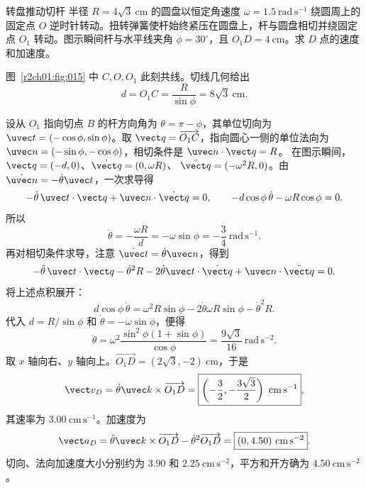 \begin{practicebox}{转盘推动切杆}
半径 $R=4\sqrt3\ \mathrm{cm}$ 的圆盘以恒定角速度 $\omega=1.5\ \mathrm{rad\,s^{-1}}$ 绕圆周上的固定点 $O$ 逆时针转动。扭转弹簧使杆始终紧压在圆盘上，杆与圆盘相切并绕固定点 $O_1$ 转动。图示瞬间杆与水平线夹角 $\phi=30^\circ$，且 $O_1D=4\ \mathrm{cm}$。求 $D$ 点的速度和加速度。
\label{r2ch01:pr:012}
\begin{solution}
图~\ref{r2ch01:fig:015} 中 $C,O,O_1$ 此刻共线。切线几何给出
\[
  d=O_1C=\frac R{\sin\phi}=8\sqrt3\ \mathrm{cm}.
\]

\figTangentRod

设从 $O_1$ 指向切点 $B$ 的杆方向角为 $\theta=\pi-\phi$，其单位切向为
$\uvec t=(-\cos\phi,\sin\phi)$。取 $\vect q=\overrightarrow{O_1C}$，指向圆心一侧的单位法向为
$\uvec n=(-\sin\phi,-\cos\phi)$，相切条件是 $\uvec n\cdot\vect q=R$。
在图示瞬间，$\vect q=(-d,0)$、$\dot{\vect q}=(0,\omega R)$、
$\ddot{\vect q}=(-\omega^2R,0)$。由 $\dot{\uvec n}=-\dot\theta\uvec t$，一次求导得
\[
 -\dot\theta\,\uvec t\cdot\vect q+\uvec n\cdot\dot{\vect q}=0,
 \qquad -d\cos\phi\,\dot\theta-\omega R\cos\phi=0.
\]
所以
\[
  \dot\theta=-\frac{\omega R}{d}=-\omega\sin\phi=-\frac34\ \mathrm{rad\,s^{-1}}.
\]
再对相切条件求导，注意 $\dot{\uvec t}=\dot\theta\uvec n$，得到
\[
 -\ddot\theta\,\uvec t\cdot\vect q-\dot\theta^2R
 -2\dot\theta\uvec t\cdot\dot{\vect q}
 +\uvec n\cdot\ddot{\vect q}=0.
\]
将上述点积展开：
\[
 d\cos\phi\,\ddot\theta
 =\omega^2R\sin\phi-2\dot\theta\omega R\sin\phi-\dot\theta^2R.
\]
代入 $d=R/\sin\phi$ 和 $\dot\theta=-\omega\sin\phi$，便得
\[
  \ddot\theta=\omega^2\frac{\sin^2\phi(1+\sin\phi)}{\cos\phi}
  =\frac{9\sqrt3}{16}\ \mathrm{rad\,s^{-2}}.
\]
取 $x$ 轴向右、$y$ 轴向上。$\overrightarrow{O_1D}=(2\sqrt3,-2)\ \mathrm{cm}$，于是
\[
  \vect v_D=\dot\theta\uvec k\times\overrightarrow{O_1D}
  =\boxed{\left(-\frac32,-\frac{3\sqrt3}{2}\right)\ \mathrm{cm\,s^{-1}}},
\]
其速率为 $\boxed{3.00\ \mathrm{cm\,s^{-1}}}$。加速度为
\[
  \vect a_D=\ddot\theta\uvec k\times\overrightarrow{O_1D}
  -\dot\theta^2\overrightarrow{O_1D}
  =\boxed{(0,4.50)\ \mathrm{cm\,s^{-2}}}.
\]
切向、法向加速度大小分别约为 $3.90$ 和 $2.25\ \mathrm{cm\,s^{-2}}$，平方和开方确为 $4.50\ \mathrm{cm\,s^{-2}}$。
\end{solution}
\end{practicebox}

